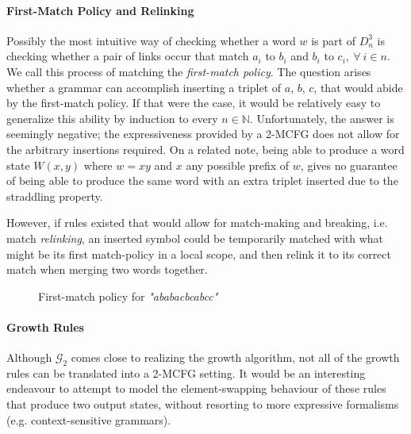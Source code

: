 \documentclass{llncs}
\newcommand{\w}[1]{\textit{"#1"}}
\begin{document}
\paragraph{\textbf{First-Match Policy and Relinking}}
Possibly the most intuitive way of checking whether a word $w$ is part of $D^3_n$ is checking whether a pair of links occur that match $a_i$ to $b_i$ and $b_i$ to $c_i, \ \forall \ i \in n$. We call this process of matching the \textit{first-match policy}. The question arises whether a grammar can accomplish inserting a triplet of $a$, $b$, $c$, that would abide by the first-match policy. If that were the case, it would be relatively easy to generalize this ability by induction to every $n \in \mathbb{N}$. Unfortunately, the answer is seemingly negative; the expressiveness provided by a 2-MCFG does not allow for the arbitrary insertions required. On a related note, being able to produce a word state $W(x,y)$ where $w=xy$ and $x$ any possible prefix of $w$, gives no guarantee of being able to produce the same word with an extra triplet inserted due to the straddling property. 

However, if rules existed that would allow for match-making and breaking, i.e. match \textit{relinking}, an inserted symbol could be temporarily matched with what might be its first match-policy in a local scope, and then relink it to its correct match when merging two words together.
\begin{figure}[h]
\centering
{}
\caption{First-match policy for \w{ababacbcabcc}}
\label{fig:fmp}
\end{figure}
\paragraph{\textbf{Growth Rules}}
Although $\mathcal{G}_2$ comes close to realizing the growth algorithm, not all of the growth rules can be translated into a 2-MCFG setting. It would be an interesting endeavour to attempt to model the element-swapping behaviour of these rules that produce two output states, without resorting to more expressive formalisms (e.g. context-sensitive grammars).
\end{document}
